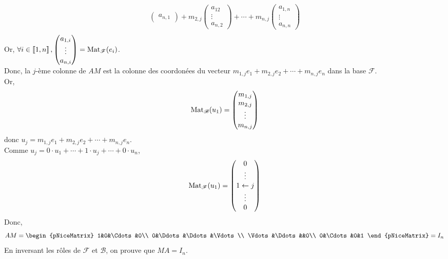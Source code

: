 \begin{prv}
\begin{enumerate}
\begin{align*}
\begin{pmatrix}
					a_{n,1}
				\end{pmatrix} + m_{2,j} \begin{pmatrix}
					a_{12}\\
					\vdots\\
					a_{n,2}
				\end{pmatrix} + \cdots + m_{n,j} \begin{pmatrix}
					a_{1,n}\\
					\vdots\\
					a_{n,n}
				\end{pmatrix} \\
			\end{align*}
			Or, $\forall i \in \left\llbracket 1,n \right\rrbracket, \begin{pmatrix}
				a_{1,i}\\
				\vdots\\
				a_{n,i}
			\end{pmatrix} = \operatorname{Mat}_\mathcal{F}(e_i)$.\\
			Donc, la $j$-ème colonne de $AM$ est la colonne des coordonées du vecteur $m_{1,j}e_1 + m_{2,j}e_2+\cdots+m_{n,j}e_n$ dans la base $\mathcal{F}$.\\
			Or, \[
				\operatorname{Mat}_{\mathcal{B}}(u_1) = \begin{pmatrix}
					m_{1,j}\\
					m_{2,j}\\
					\vdots\\
					m_{n,j}
				\end{pmatrix}
			\] donc $u_j = m_{1,j}e_1 + m_{2,j}e_2 + \cdots + m_{n,j}e_n$.\\
			Comme $u_j = 0 \cdot u_1 + \cdots + 1\cdot u_j + \cdots + 0 \cdot u_n$, \[
				\operatorname{Mat}_{\mathcal{F}}(u_1) = \begin{pmatrix}
					0\\
					\vdots\\
					1 \leftarrow j\\
					\vdots\\
					0
				\end{pmatrix}
			\] Donc, %
			\[
				AM = \begin{pNiceMatrix}
					1&0&\Cdots&0\\
					0&\Ddots&\Ddots&\Vdots\\
					\Vdots&\Ddots&&0\\
					0&\Cdots&0&1
				\end{pNiceMatrix} = I_n
			\]
			En inversant les rôles de $\mathcal{F}$ et $\mathcal{B}$, on prouve que $MA = I_n$.\\[5mm]

\end{enumerate}
\end{prv}
